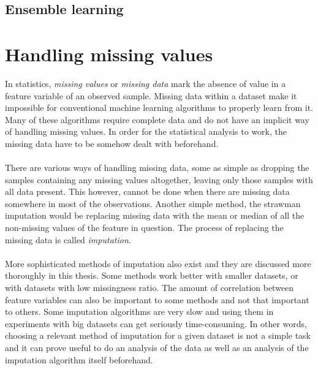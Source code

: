 \documentclass[11pt]{article}
\begin{document}
    \subsection{Ensemble learning}
  \newpage
  \section{Handling missing values}
    In statistics, {\it missing values} or {\it missing data} mark the absence of value in a feature variable of an observed sample. Missing data within a dataset make it impossible for conventional machine learning algorithms to properly learn from it. Many of these algorithms require complete data and do not have an implicit way of handling missing values. In order for the statistical analysis to work, the missing data have to be somehow dealt with beforehand. \citep{otfi}
    \\~\\
    There are various ways of handling missing data, some as simple as dropping the samples containing any missing values altogether, leaving only those samples with all data present. \citep{lwd} This however, cannot be done when there are missing data somewhere in most of the observations. Another simple method, the strawman imputation \citep{otfi} would be replacing missing data with the mean or median of all the non-missing values of the feature in question. The process of replacing the missing data is called {\it imputation}.
    \\~\\
    More sophisticated methods of imputation also exist and they are discussed more thoroughly in this thesis. Some methods work better with smaller datasets, or with datasets with low missingness ratio. The amount of correlation between feature variables can also be important to some methods and not that important to others. \citep{otfi} Some imputation algorithms are very slow and using them in experiments with big datasets can get seriously time-consuming. In other words, choosing a relevant method of imputation for a given dataset is not a simple task and it can prove useful to do an analysis of the data as well as an analysis of the imputation algorithm itself beforehand.
\end{document}
